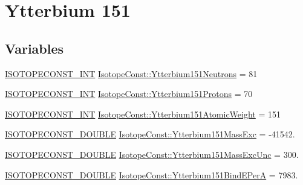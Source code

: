 \hypertarget{group___isotope_const-_ytterbium-_yb151}{}\section{Ytterbium 151}
\label{group___isotope_const-_ytterbium-_yb151}
\subsection*{Variables}
\begin{DoxyCompactItemize}
\item 
\mbox{\hyperlink{group___isotope_const-_macros_ga5f18360b3e99483a35c32d789e62621c}{I\+S\+O\+T\+O\+P\+E\+C\+O\+N\+S\+T\+\_\+\+I\+NT}} \mbox{\hyperlink{group___isotope_const-_ytterbium-_yb151_ga4759b2f9ccd22373890ab2aff1e704a0}{Isotope\+Const\+::\+Ytterbium151\+Neutrons}} = 81
\item 
\mbox{\hyperlink{group___isotope_const-_macros_ga5f18360b3e99483a35c32d789e62621c}{I\+S\+O\+T\+O\+P\+E\+C\+O\+N\+S\+T\+\_\+\+I\+NT}} \mbox{\hyperlink{group___isotope_const-_ytterbium-_yb151_ga2d49697ecb80c98a6af5af83e5f42b53}{Isotope\+Const\+::\+Ytterbium151\+Protons}} = 70
\item 
\mbox{\hyperlink{group___isotope_const-_macros_ga5f18360b3e99483a35c32d789e62621c}{I\+S\+O\+T\+O\+P\+E\+C\+O\+N\+S\+T\+\_\+\+I\+NT}} \mbox{\hyperlink{group___isotope_const-_ytterbium-_yb151_ga06d4c6a2f1e29787a446ff6c21f69197}{Isotope\+Const\+::\+Ytterbium151\+Atomic\+Weight}} = 151
\item 
\mbox{\hyperlink{group___isotope_const-_macros_ga8f45a7272ce02c0b4c65c44636ed719a}{I\+S\+O\+T\+O\+P\+E\+C\+O\+N\+S\+T\+\_\+\+D\+O\+U\+B\+LE}} \mbox{\hyperlink{group___isotope_const-_ytterbium-_yb151_gaab11b08538436d6351e451f4df96d5ab}{Isotope\+Const\+::\+Ytterbium151\+Mass\+Exc}} = -\/41542.
\item 
\mbox{\hyperlink{group___isotope_const-_macros_ga8f45a7272ce02c0b4c65c44636ed719a}{I\+S\+O\+T\+O\+P\+E\+C\+O\+N\+S\+T\+\_\+\+D\+O\+U\+B\+LE}} \mbox{\hyperlink{group___isotope_const-_ytterbium-_yb151_gaf0f099baa55d34038f6f57641fd37926}{Isotope\+Const\+::\+Ytterbium151\+Mass\+Exc\+Unc}} = 300.
\item 
\mbox{\hyperlink{group___isotope_const-_macros_ga8f45a7272ce02c0b4c65c44636ed719a}{I\+S\+O\+T\+O\+P\+E\+C\+O\+N\+S\+T\+\_\+\+D\+O\+U\+B\+LE}} \mbox{\hyperlink{group___isotope_const-_ytterbium-_yb151_ga40ed92013c5830d158923b4170fda5d1}{Isotope\+Const\+::\+Ytterbium151\+Bind\+E\+PerA}} = 7983.
\item 

\end{DoxyCompactItemize}
